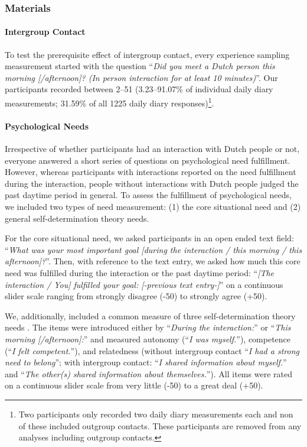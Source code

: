 \documentclass[man, 12pt, a4paper]{apa7}
\theoremstyle{break}
\theoremstyle{plain}
\begin{document}
\subsubsection{Materials}

\paragraph{Intergroup Contact}

To test the prerequisite effect of intergroup contact, every experience
sampling measurement started with the question
``\textit{Did you meet a Dutch person this morning [/afternoon]? (In person interaction for at least 10 minutes)}''.
Our participants recorded between 2--51 (3.23--91.07\% of individual
daily diary measurements; 31.59\% of all 1225 daily diary
responses)\footnote{Two participants only recorded two daily diary measurements each and non of these included outgroup contacts. These participants are removed from any analyses including outgroup contacts.}.

\paragraph{Psychological Needs}

Irrespective of whether participants had an interaction with Dutch
people or not, everyone answered a short series of questions on
psychological need fulfillment. However, whereas participants with
interactions reported on the need fulfillment during the interaction,
people without interactions with Dutch people judged the past daytime
period in general. To assess the fulfillment of psychological needs, we
included two types of need measurement: (1) the core situational need
and (2) general self-determination theory needs.

For the core situational need, we asked participants in an open ended
text field:
``\textit{What was your most important goal [during the interaction / this morning / this afternoon]?}''.
Then, with reference to the text entry, we asked how much this core need
was fulfilled during the interaction or the past daytime period:
``\textit{[The interaction / You] fulfilled your goal: [-previous text entry-]}''
on a continuous slider scale ranging from strongly disagree (-50) to
strongly agree (+50).

We, additionally, included a common measure of three self-determination
theory needs \citep[see][]{Downie2008}. The items were introduced either
by ``\textit{During the interaction:}'' or
``\textit{This morning [/afternoon]:}'' and measured autonomy
(``\textit{I was myself.}''), competence
(``\textit{I felt competent.}''), and relatedness (without intergroup
contact ``\textit{I had a strong need to belong}''; with intergroup
contact: ``\textit{I shared information about myself.}'' and
``\textit{The other(s) shared information about themselves.}''). All
items were rated on a continuous slider scale from very little (-50) to
a great deal (+50).
\end{document}
